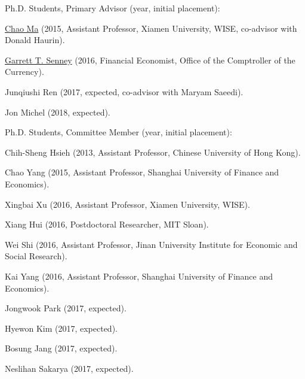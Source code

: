 \documentclass[10pt,letterpaper]{article}
\renewenvironment{itemize}{
  \begin{list}{}{
    \setlength{\leftmargin}{1.5em}
    \setlength{\itemsep}{0.25em}
    \setlength{\parskip}{0pt}
    \setlength{\parsep}{0.25em}
  }
}{
  \end{list}
}
\begin{document}
\begin{itemize}
\item Ph.D. Students, Primary Advisor (year, initial placement):
  \begin{itemize}
  \item \href{http://chaoma2014.weebly.com}{Chao Ma} (2015, Assistant Professor, Xiamen University, WISE, co-advisor with Donald Haurin).
  \item \href{http://garrettsenney.weebly.com}{Garrett T. Senney} (2016, Financial Economist, Office of the Comptroller of the Currency).
  \item Junqiushi Ren (2017, expected, co-advisor with Maryam Saeedi).
  \item Jon Michel (2018, expected).
  \end{itemize}
\item Ph.D. Students, Committee Member (year, initial placement):
  \begin{itemize}
  \item Chih-Sheng Hsieh (2013, Assistant Professor, Chinese University of Hong Kong).
  \item Chao Yang (2015, Assistant Professor, Shanghai University of Finance and Economics).
  \item Xingbai Xu (2016, Assistant Professor, Xiamen University, WISE).
  \item Xiang Hui (2016, Postdoctoral Researcher, MIT Sloan).
  \item Wei Shi (2016, Assistant Professor, Jinan University Institute for Economic and Social Research).
  \item Kai Yang (2016, Assistant Professor, Shanghai University of Finance and Economics).
  \item Jongwook Park (2017, expected).
  \item Hyewon Kim (2017, expected).
  \item Bosung Jang (2017, expected).
  \item Neslihan Sakarya (2017, expected).

\end{itemize}
\end{itemize}
\end{document}

